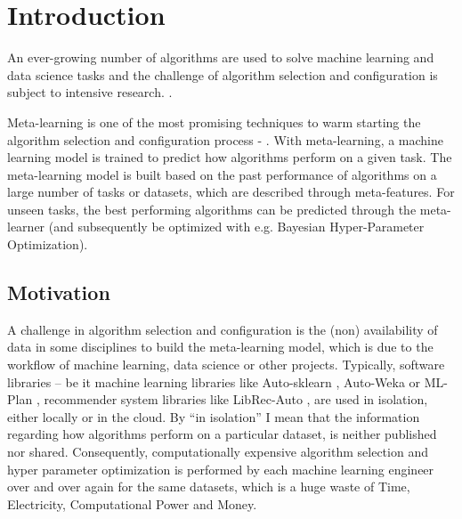 \chapter{Introduction}
An ever-growing number of algorithms are used to solve machine learning and data science tasks and the challenge of algorithm selection and configuration is subject to intensive research.  \citep{bischl-et-al,brazdil:p,calandra-et-al,collins-et-al2018,romero-et-al,vartak-et-al}. 


Meta-learning is one of the most promising techniques to warm starting the algorithm selection and configuration process - \citep{hutter-et-al}. With meta-learning, a machine learning model is trained to predict how algorithms perform on a given task. The meta-learning model is built based on the past performance of algorithms on a large number of tasks or datasets, which are described through meta-features. For unseen tasks, the best performing algorithms can be predicted through the meta-learner (and subsequently be optimized with e.g. Bayesian Hyper-Parameter Optimization).

\section{Motivation}
A challenge in algorithm selection and configuration is the (non) availability of data in some disciplines to build the meta-learning model, which is due to the workflow of machine learning, data science or other projects. Typically, software libraries – be it machine learning libraries like Auto-sklearn \citep{feurer:m}, Auto-Weka \citep{kotthoff:l} or ML-Plan \citep{mohr:f}, recommender system libraries like LibRec-Auto \citep{mansoury:m}, are used in isolation, either locally or in the cloud. By “in isolation” I mean that the information regarding how algorithms perform on a particular dataset, is neither published nor shared. Consequently, computationally expensive algorithm selection and hyper parameter optimization is performed by each machine learning engineer over and over again for the same datasets, which is a huge waste of Time, Electricity, Computational Power and Money.

